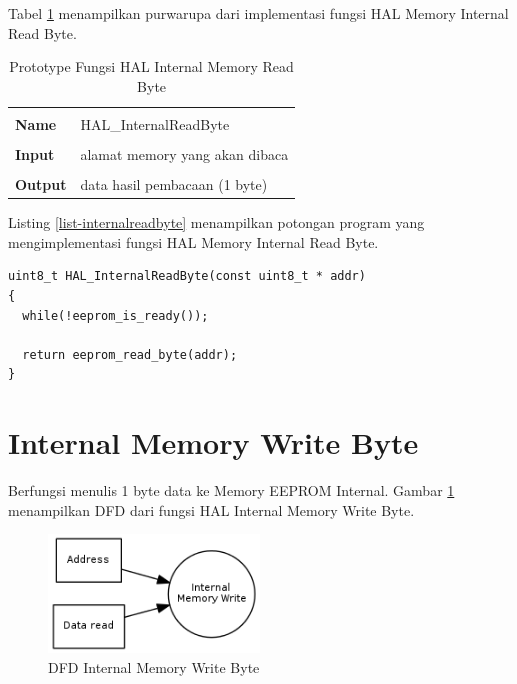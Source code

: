 Tabel \ref{tabel-internalreadbyte} menampilkan purwarupa dari implementasi fungsi HAL Memory Internal Read Byte. 

\begin{table}[!h]
  \centering
  \begin{tabular}{p{2cm} p{8cm}}
    \hline\\
    {\bf Name} & HAL\_InternalReadByte\\
    \hline\\
    {\bf Input} & alamat memory yang akan dibaca
    \\
    \hline\\
    {\bf Output} & data hasil pembacaan (1 byte)
    \\
    \hline
  \end{tabular}
  \caption{Prototype Fungsi HAL Internal Memory Read Byte}
  \label{tabel-internalreadbyte}
\end{table}

Listing \ref{list-internalreadbyte} menampilkan potongan program yang mengimplementasi fungsi HAL Memory Internal Read Byte.

\begin{lstlisting}[caption={Listing Program Fungsi HAL Memory Internal Read Byte}, label={list-internalreadbyte}]
uint8_t HAL_InternalReadByte(const uint8_t * addr)
{
  while(!eeprom_is_ready());

  return eeprom_read_byte(addr);
}
\end{lstlisting}

\section{Internal Memory Write Byte}
\label{sec_internalmemorywritebyte}

Berfungsi menulis 1 byte data ke Memory EEPROM Internal. Gambar \ref{fig-dfd-internalwritebyte} menampilkan DFD dari fungsi HAL Internal Memory Write Byte. 

\begin{figure}[!h]
\centering
\includegraphics[width=0.5\textwidth]{image/hal/dfd_internalwritebyte.png}
\caption{DFD Internal Memory Write Byte}
\label{fig-dfd-internalwritebyte}
\end{figure}

